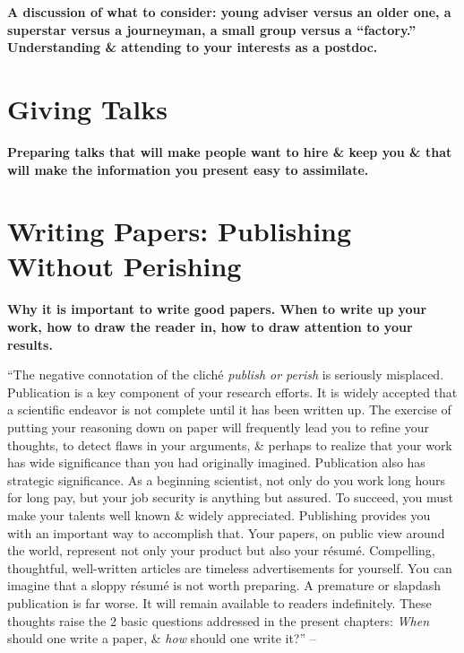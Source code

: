 \documentclass{article}
\numberwithin{equation}{section}
\begin{document}
\begin{center}
	\textsf{\textbf{A discussion of what to consider: young adviser versus an older one, a superstar versus a journeyman, a small group versus a ``factory.'' Understanding \& attending to your interests as a postdoc.}}
\end{center}


\section{Giving Talks}

\begin{center}
	\textsf{\textbf{Preparing talks that will make people want to hire \& keep you \& that will make the information you present easy to assimilate.}}
\end{center}


\section{Writing Papers: Publishing Without Perishing}

\begin{center}
	\textsf{\textbf{Why it is important to write good papers. When to write up your work, how to draw the reader in, how to draw attention to your results.}}
\end{center}
``The negative connotation of the clich\'e  \textit{publish or perish} is seriously misplaced. Publication is a key component of your research efforts. It is widely accepted that a scientific endeavor is not complete until it has been written up. The exercise of putting your reasoning down on paper will frequently lead you to refine your thoughts, to detect flaws in your arguments, \& perhaps to realize that your work has wide significance than you had originally imagined. Publication also has strategic significance. As a beginning scientist, not only do you work long hours for long pay, but your job security is anything but assured. To succeed, you must make your talents well known \& widely appreciated. Publishing provides you with an important way to accomplish that. Your papers, on public view around the world, represent not only your product but also your r\'esum\'e. Compelling, thoughtful, well-written articles are timeless advertisements for yourself. You can imagine that a sloppy r\'esum\'e is not worth preparing. A premature or slapdash publication is far worse. It will remain available to readers indefinitely. These thoughts raise the 2 basic questions addressed in the present chapters: \textit{When} should one write a paper, \& \textit{how} should one write it?'' -- \cite[pp. 53--54]{Feibelman2011}
\end{document}
